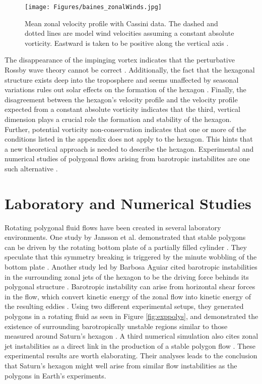 \documentclass[preprint]{revtex4-1} %
\begin{document}
\begin{figure}[ht]
  \centering
  \texttt{[image: Figures/baines\_zonalWinds.jpg]}
  \caption{Mean zonal velocity
    profile with Cassini data.  The dashed and dotted lines are model
    wind velocities assuming a constant absolute vorticity.  Eastward
    is taken to be positive along the vertical axis \cite[fig~3]{Baines2009}.} 
  \label{fig:baines_zonalV}
\end{figure}

The disappearance of the impinging vortex indicates that the
perturbative Rossby wave theory cannot be correct \cite{Fletcher2008}.
Additionally, the fact that the 
hexagonal structure exists deep into the troposphere and seems
unaffected by seasonal variations rules out solar effects on the
formation of the hexagon \cite{Baines2009}.  Finally, the
disagreement between the hexagon's velocity profile and the velocity
profile expected from a constant absolute vorticity indicates that the third,
vertical dimension plays a crucial role the formation and stability of
the hexagon.  Further, potential vorticity non-conservation indicates
that one or more of the conditions listed in the appendix
does not apply to the hexagon.  This
hints that a new theoretical approach is needed to describe the
hexagon.  Experimental and numerical studies of polygonal flows
arising from barotropic instabilites are one such alternative
\cite{Baines2009}.

\section{Laboratory and Numerical Studies}
\label{sec:expnum}
Rotating polygonal fluid flows have been created in several laboratory
environments.  One study by Jansson et al. demonstrated that stable
polygons can be driven by the rotating bottom plate of a partially
filled cylinder \cite{Jansson2006}.  They speculate that this symmetry
breaking is triggered by the minute wobbling of the bottom plate
\cite{Jansson2006}.  Another study led by Barbosa Aguiar cited
barotropic instabilities in the surrounding zonal jets of the hexagon
to be the driving force behinds its polygonal structure
\cite{BarbosaAguiar2010}.  Barotropic instability can arise from
horizontal shear forces in the flow, which convert
kinetic energy of the zonal flow into kinetic energy of the resulting
eddies \cite{BarbosaAguiar2010, Pedlosky87}. Using two
different experimental setups, 
they generated polygons in a rotating fluid as seen in Figure
\ref{fig:exppolys}, and demonstrated the 
existence of surrounding barotropically unstable regions similar to
those measured around Saturn's hexagon \cite{BarbosaAguiar2010}.  A
third numerical simulation also cites zonal jet instabilities as a
direct link in the production of a stable polygon flow
\cite{MoralesJuberias2011}.  These experimental results are worth
elaborating.  Their analyses leads to the conclusion that Saturn's hexagon
might well arise from similar flow instabilities as the polygons in
Earth's experiments.
\end{document}

